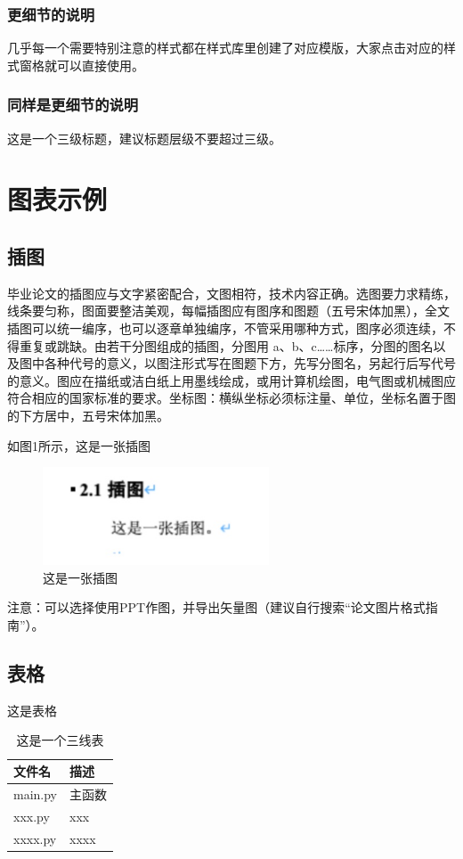 \documentclass[12pt,a4paper]{ctexart}
\begin{document}
\subsubsection{更细节的说明}
几乎每一个需要特别注意的样式都在样式库里创建了对应模版，大家点击对应的样式窗格就可以直接使用。
\subsubsection{同样是更细节的说明}
这是一个三级标题，建议标题层级不要超过三级。

\newpage
\section{图表示例}
\subsection{插图}
毕业论文的插图应与文字紧密配合，文图相符，技术内容正确。选图要力求精练，线条要匀称，图面要整洁美观，每幅插图应有图序和图题（五号宋体加黑），全文插图可以统一编序，也可以逐章单独编序，不管采用哪种方式，图序必须连续，不得重复或跳缺。由若干分图组成的插图，分图用 a、b、c……标序，分图的图名以及图中各种代号的意义，以图注形式写在图题下方，先写分图名，另起行后写代号的意义。图应在描纸或洁白纸上用墨线绘成，或用计算机绘图，电气图或机械图应符合相应的国家标准的要求。坐标图：横纵坐标必须标注量、单位，坐标名置于图的下方居中，五号宋体加黑。

如图1所示，这是一张插图
\begin{figure}[h]
\centering
\includegraphics[width=0.6\textwidth]{1.png}
\caption{这是一张插图}
\label{fig:example}
\end{figure}

注意：可以选择使用PPT作图，并导出矢量图（建议自行搜索“论文图片格式指南”）。

\subsection{表格}
这是表格
\begin{table}[h]
    \centering
    \caption{这是一个三线表}
    \begin{tabular}{ll}
        \toprule
        文件名 & 描述 \\
        \midrule
        main.py & 主函数 \\
        xxx.py & xxx \\
        xxxx.py & xxxx \\
        \bottomrule
    \end{tabular}
\end{table}
\end{document}
